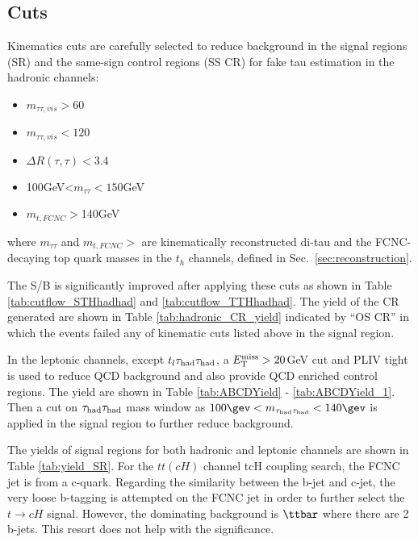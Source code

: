 
\subsection{Cuts}
\label{sec:cuts}

Kinematics cuts are carefully selected to reduce background in the signal regions (SR) and the same-sign control regions (SS CR) for fake tau estimation in the hadronic channels:
\begin{itemize}
  \item $m_{\tau\tau,vis}>60$
  \item $m_{\tau\tau,vis}<120$
  \item $\Delta R(\tau,\tau)<3.4$
  \item 100GeV<$m_{\tau\tau}<150$GeV
  \item $m_{t,FCNC}>$140GeV
\end{itemize}
where $m_{\tau\tau}$ and $m_{t,FCNC}>$ are kinematically reconstructed di-tau and the FCNC-decaying top quark masses in the $t_h$ channels, defined in Sec.~\ref{sec:reconstruction}.

The S/B is significantly improved after applying these cuts as shown in Table \ref{tab:cutflow_STHhadhad} and \ref{tab:cutflow_TTHhadhad}. The yield of the CR generated are shown in Table \ref{tab:hadronic_CR_yield} indicated by ``OS CR'' in which the events failed any of kinematic cuts listed above in the signal region.

In the leptonic channels, except $t_l\tau_\text{had}{}\tau_\text{had}$, a $E_{\text{T}}^{\text{miss}}>20$GeV cut and PLIV tight is used to reduce QCD background and also provide QCD enriched control regions. The yield are shown in Table \ref{tab:ABCDYield} - \ref{tab:ABCDYield_1}. Then a cut on $\tau_\text{had}{}\tau_\text{had}$ mass window as $100\gev<m_{\thadhad}<140\gev$ is applied in the signal region to further reduce background.

The yields of signal regions for both hadronic and leptonic channels are shown in Table \ref{tab:yield_SR}.
For the $tt(cH)$ channel tcH coupling search, the FCNC jet is from a c-quark. Regarding the similarity between the b-jet and c-jet,
the very loose b-tagging is attempted on the FCNC jet in order to further select the $t\to cH$ signal. However,
the dominating background is $\ttbar$ where there are 2 b-jets. This resort does not help with the significance.
